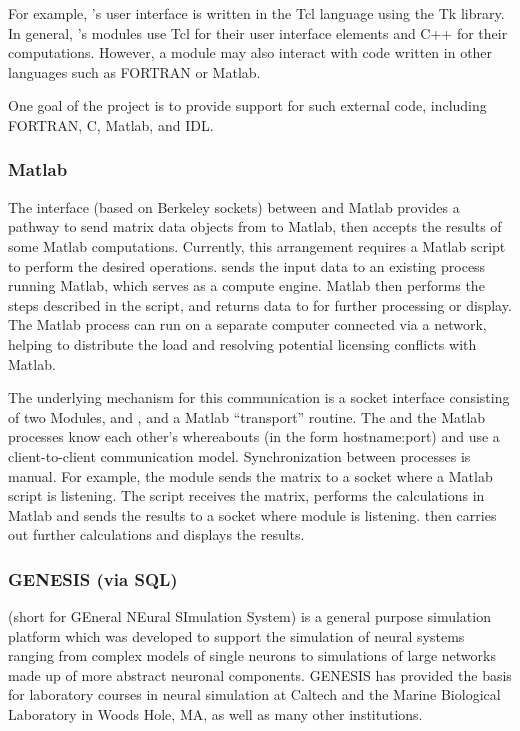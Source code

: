 For example, \sr{}'s user interface is written in the Tcl language
using the Tk library.  In general, \sr{}'s modules use Tcl for their
user interface elements and C++ for their computations.  However, a
module may also interact with code written in other languages such as
FORTRAN or Matlab.

One goal of the \BIOPSE{} project is to provide
support for such external code, including FORTRAN, C, Matlab, and
IDL\@.

\subsubsection{Matlab}
\label{sec:concept-matlab} 

The interface (based on Berkeley sockets) between \SR{} and Matlab provides
a pathway to send matrix data objects from \SR{} to Matlab, then accepts
the results of some Matlab computations.  Currently, this arrangement
requires a Matlab script to perform the desired
operations.  \SR{} sends the input data to an existing process running
Matlab, which serves as a compute engine. Matlab then performs the steps
described in the script, and returns data to \SR{} for further
processing or display.  The Matlab process can run on a separate
computer connected via a network, helping to distribute the load and resolving potential licensing conflicts with Matlab.

The underlying mechanism for this communication is a socket interface
consisting of two \SR{} Modules,  and
, and a Matlab ``transport'' routine. The \SR{}
and the Matlab processes know each other's whereabouts (in the form
hostname:port) and use a client-to-client communication model.
Synchronization between processes is manual.  For example, 
the \SR{}  module sends the matrix to a socket where a 
Matlab script is listening.  The script receives the matrix, 
performs the calculations in Matlab and sends the results to a socket 
where  module is listening.  \SR   then carries out
further calculations and displays the results.


\subsubsection{GENESIS (via SQL)}

(short for GEneral NEural SImulation System) is a general purpose
simulation platform which was developed to support the simulation of neural
systems ranging from complex models of single neurons to simulations of
large networks made up of more abstract neuronal components. GENESIS has
provided the basis for laboratory courses in neural simulation at
Caltech and the Marine Biological Laboratory in Woods Hole, MA, as well as
many other institutions.   

